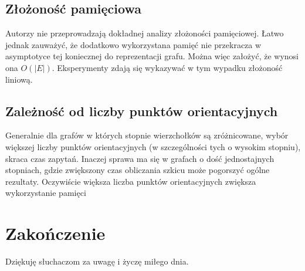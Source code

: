 \documentclass{article}
\theoremstyle{definition}
\begin{document}
    \subsection{Złożoność pamięciowa}
        Autorzy nie przeprowadzają dokładnej analizy złożoności pamięciowej. Łatwo jednak zauważyć, że dodatkowo wykorzystana pamięć nie przekracza w asymptotyce tej koniecznej do reprezentacji grafu. Można więc założyć, że wynosi ona $O(|E|)$. Eksperymenty zdają się wykazywać w tym wypadku złożoność liniową.

    \subsection{Zależność od liczby punktów orientacyjnych}
        Generalnie dla grafów w których stopnie wierzchołków są zróżnicowane, wybór większej liczby punktów orientacyjnych (w szczególności tych o wysokim stopniu), skraca czas zapytań. Inaczej sprawa ma się w grafach o dość jednostajnych stopniach, gdzie zwiększony czas obliczania szkicu może pogorszyć ogólne rezultaty. Oczywiście większa liczba punktów orientacyjnych zwiększa wykorzystanie pamięci 
    \section{Zakończenie}
    Dziękuję słuchaczom za uwagę i życzę miłego dnia. 
    
\end{document}
